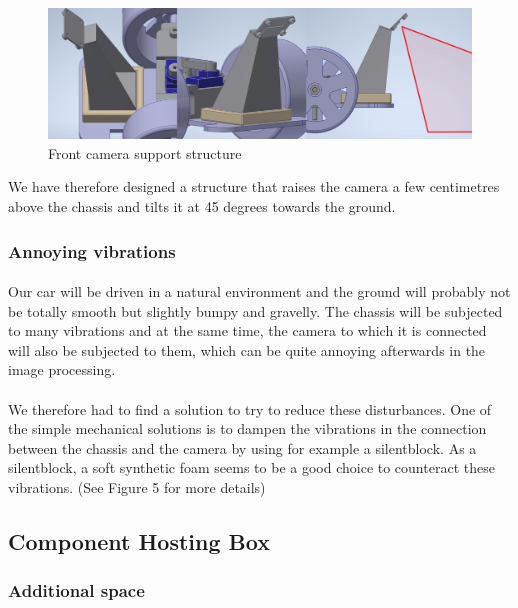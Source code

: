 \begin{figure}[!ht]
    \begin{center}
        \includegraphics[scale=0.58]{Images/camera_support.jpg}
    \end{center}
    \caption{Front camera support structure}
    \label{fig:camera_support}
\end{figure}

We have therefore designed a structure that raises the camera a few centimetres
above the chassis and tilts it at 45 degrees towards the ground. 

\subsubsection{Annoying vibrations}
\paragraph{}
Our car will be driven in a natural environment and the ground will probably
not be totally smooth but slightly bumpy and gravelly. The chassis will be
subjected to many vibrations and at the same time, the camera to which it is
connected will also be subjected to them, which can be quite annoying
afterwards in the image processing.

\paragraph{}
We therefore had to find a solution to try to reduce these disturbances.
One of the simple mechanical solutions is to dampen the vibrations in the
connection between the chassis and the camera by using for example a silentblock.
As a silentblock, a soft synthetic foam seems to be a good choice to counteract
these vibrations. (See Figure 5 for more details)

\subsection{Component Hosting Box}

\subsubsection{Additional space}
